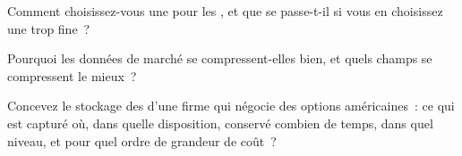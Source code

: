 \begin{interviewq}\label{iq:pl:capturing-and-storing-tick-data:4}
Comment choisissez-vous une  pour les , et que se passe-t-il si vous en choisissez une trop fine~?
\end{interviewq}

\begin{interviewq}\label{iq:pl:capturing-and-storing-tick-data:5}
Pourquoi les données de marché se compressent-elles bien, et quels champs se compressent le mieux~?
\end{interviewq}

\begin{interviewq}\label{iq:pl:capturing-and-storing-tick-data:6}
Concevez le stockage des  d'une firme qui négocie des options américaines~: ce qui est capturé où, dans quelle disposition, conservé combien de temps, dans
quel niveau, et pour quel ordre de grandeur de coût~?
\end{interviewq}
